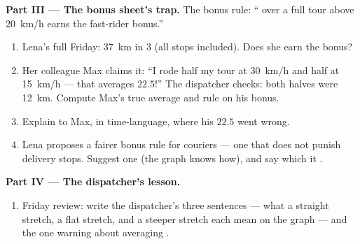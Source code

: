 \begin{problem}
\medskip\noindent\textbf{Part III --- The bonus sheet's trap.}
The bonus rule: `` over a full tour above
\qty{20}{km/h} earns the fast-rider bonus.''
\begin{enumerate}[resume]
  \item Lena's full Friday: \qty{37}{km} in $3$  (all
        stops included). Does she earn the bonus?
  \item Her colleague Max claims it: ``I rode half my tour at
        \qty{30}{km/h} and half at \qty{15}{km/h} ---
        that averages $22.5$!'' The dispatcher checks: both
        halves were \qty{12}{km}. Compute Max's true average
        and rule on his bonus.
  \item Explain to Max, in time-language, where his $22.5$
        went wrong.
  \item Lena proposes a fairer bonus rule for couriers ---
        one that does not punish delivery stops. Suggest one
        (the graph knows how), and say which  it
        .
\end{enumerate}

\medskip\noindent\textbf{Part IV --- The dispatcher's lesson.}
\begin{enumerate}[resume]
  \item Friday review: write the dispatcher's three
        sentences --- what a straight stretch, a flat
        stretch, and a steeper stretch each mean on the
        graph --- and the one warning about averaging
        .
\end{enumerate}
\end{problem}
